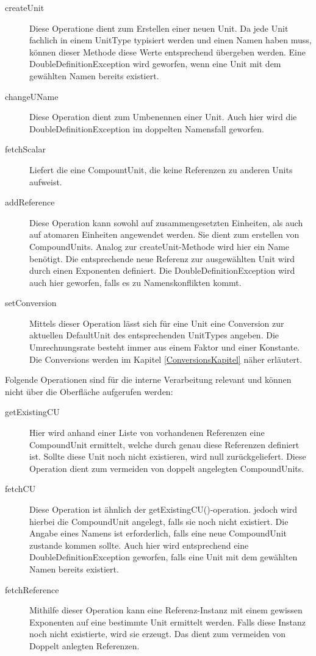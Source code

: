 \begin{description}
\item[createUnit]
Diese Operatione dient zum Erstellen einer neuen Unit. Da jede Unit fachlich in einem UnitType typisiert werden und einen Namen haben muss, können dieser Methode diese Werte entsprechend übergeben werden. Eine DoubleDefinitionException wird geworfen, wenn eine Unit mit dem gewählten Namen bereits existiert.
\item[changeUName]
Diese Operation dient zum Umbenennen einer Unit. Auch hier wird die DoubleDefinitionException im doppelten Namensfall geworfen.
\item[fetchScalar]
Liefert die eine CompountUnit, die keine Referenzen zu anderen Units aufweist.
\item[addReference]
Diese Operation kann sowohl auf zusammengesetzten Einheiten, als auch auf atomaren Einheiten angewendet werden. Sie dient zum erstellen von CompoundUnits. Analog zur createUnit-Methode wird hier ein Name benötigt. Die entsprechende neue Referenz zur ausgewählten Unit wird durch einen Exponenten definiert. Die DoubleDefinitionException wird auch hier geworfen, falls es zu Namenskonflikten kommt.
\item[setConversion]
Mittels dieser Operation lässt sich für eine Unit eine Conversion zur aktuellen DefaultUnit des entsprechenden UnitTypes angeben. Die Umrechnungsrate besteht immer aus einem Faktor und einer Konstante. Die Conversions werden im Kapitel \ref{ConversionsKapitel} näher erläutert.
\end{description}

Folgende Operationen sind für die interne Verarbeitung relevant und können nicht über die Oberfläche aufgerufen werden:
\begin{description}

\item[getExistingCU]
Hier wird anhand einer Liste von vorhandenen Referenzen eine CompoundUnit ermittelt, welche durch genau diese Referenzen definiert ist. Sollte diese Unit noch nicht existieren, wird null zurückgeliefert. Diese Operation dient zum vermeiden von doppelt angelegten CompoundUnits.
\item[fetchCU]
Diese Operation ist ähnlich der getExistingCU()-operation. jedoch wird hierbei die CompoundUnit angelegt, falls sie noch nicht existiert. Die Angabe eines Namens ist erforderlich, falls eine neue CompoundUnit zustande kommen sollte. Auch hier wird entsprechend eine DoubleDefinitionException geworfen, falls eine Unit mit dem gewählten Namen bereits existiert.
\item[fetchReference]
Mithilfe dieser Operation kann eine Referenz-Instanz mit einem gewissen Exponenten auf eine bestimmte Unit ermittelt werden. Falls diese Instanz noch nicht existierte, wird sie erzeugt. Das dient zum vermeiden von Doppelt anlegten Referenzen.
\end{description}

